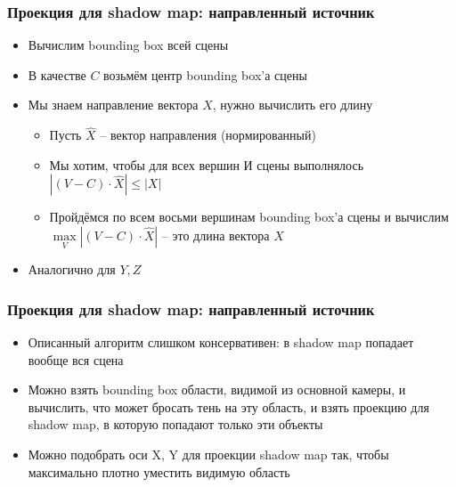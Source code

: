 \documentclass[10pt]{beamer}
\begin{document}
\begin{frame}[fragile]
\frametitle{Проекция для shadow map: направленный источник}
\begin{itemize}
\item Вычислим bounding box всей сцены
\pause
\item В качестве \begin{math}C\end{math} возьмём центр bounding box'а сцены
\pause
\item Мы знаем направление вектора \begin{math}X\end{math}, нужно вычислить его длину
\begin{itemize}
\item Пусть \begin{math}\hat X\end{math} -- вектор направления (нормированный)
\item Мы хотим, чтобы для всех вершин \begin{math}И\end{math} сцены выполнялось \begin{math}|(V - C) \cdot \hat X| \leq |X|\end{math}
\pause
\item Пройдёмся по всем восьми вершинам bounding box'а сцены и вычислим \begin{math}\max\limits_V |(V - C) \cdot \hat X|\end{math} -- это длина вектора \begin{math}X\end{math}
\end{itemize}
\pause
\item Аналогично для \begin{math}Y, Z\end{math}
\end{itemize}
\end{frame}

\begin{frame}[fragile]
\frametitle{Проекция для shadow map: направленный источник}
\begin{itemize}
\item Описанный алгоритм слишком консервативен: в shadow map попадает вообще вся сцена
\pause
\item Можно взять bounding box области, видимой из основной камеры, и вычислить, что может бросать тень на эту область, и взять проекцию для shadow map, в которую попадают только эти объекты
\pause
\item Можно подобрать оси X, Y для проекции shadow map так, чтобы максимально плотно уместить видимую область
\end{itemize}
\end{frame}
\end{document}
